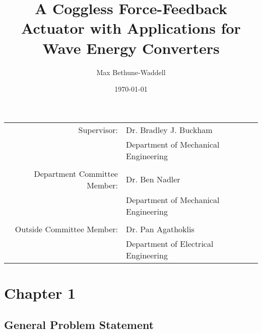 \documentclass{article}
\title{A Coggless Force-Feedback Actuator with Applications for Wave Energy Converters}
\author{Max Bethune-Waddell}
\date{\today}
\begin{document}
\maketitle

\begin{tabular}{ r l }
Supervisor:                         & Dr. Bradley J. Buckham \\
{}                                  & Department of Mechanical Engineering \\
{}                                  & {} \\
Department Committee Member:        & Dr. Ben Nadler \\
 {}                               & Department of Mechanical Engineering  \\
{}                               & {}  \\
Outside Committee Member:           & Dr. Pan Agathoklis\\
   {}                               & Department of Electrical Engineering  \\
\end{tabular}

\clearpage
\tableofcontents


\clearpage


\section{Chapter 1}

\subsection{General Problem Statement}
\end{document}
